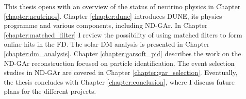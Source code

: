 This thesis opens with an overview of the status of neutrino physics in Chapter \ref{chapter:neutrinos}. Chapter \ref{chapter:dune} introduces DUNE, its physics programme and various components, including ND-GAr. In Chapter \ref{chapter:matched_filter} I review the possibility of using matched filters to form online hits in the FD. The solar DM analysis is presented in Chapter \ref{chapter:dm_analysis}. Chapter \ref{chapter:garsoft_pid} describes the work on the ND-GAr reconstruction focused on particle identification. The event selection studies in ND-GAr are covered in Chapter \ref{chapter:gar_selection}. Eventually, the thesis concludes with Chapter \ref{chapter:conclusion}, where I discuss future plans for the different projects.